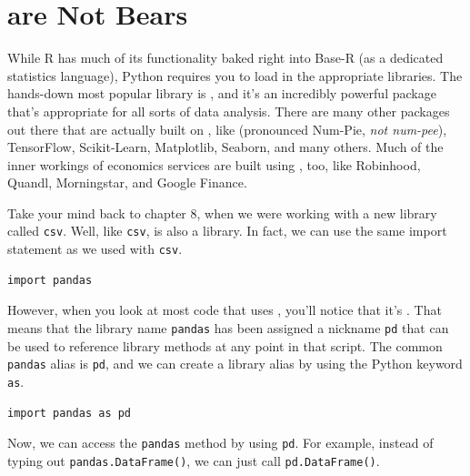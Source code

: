 \section{ are Not Bears}
While R has much of its functionality baked right into Base-R (as a dedicated statistics language), Python requires you to load in the appropriate libraries. The hands-down most popular library is , and it's an incredibly powerful package that's appropriate for all sorts of data analysis. There are many other packages out there that are actually built on , like  (pronounced Num-Pie, \textit{not num-pee}), TensorFlow, Scikit-Learn, Matplotlib, Seaborn, and many others. Much of the inner workings of economics services are built using , too, like Robinhood, Quandl, Morningstar, and Google Finance.\par
{}
Take your mind back to chapter 8, when we were working with a new library called \verb|csv|. Well, like \verb|csv|,  is also a library. In fact, we can use the same import statement as we used with \verb|csv|.
\begin{lstlisting}[style=pippython]
import pandas
\end{lstlisting}
However, when you look at most code that uses , you'll notice that it's . That means that the library name \verb|pandas| has been assigned a nickname \verb|pd| that can be used to reference library methods at any point in that script. The common \verb|pandas| alias is \verb|pd|, and we can create a library alias by using the Python keyword \verb|as|.
\begin{lstlisting}[style=pippython]
import pandas as pd
\end{lstlisting}
Now, we can access the \verb|pandas| method by using \verb|pd|. For example, instead of typing out \verb|pandas.DataFrame()|, we can just call \verb|pd.DataFrame()|.\par
{}
 

